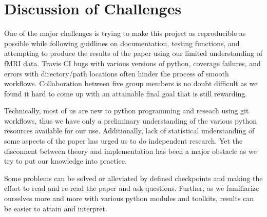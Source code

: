 \section{Discussion of Challenges}

\par \indent One of the major challenges is trying to make this project as 
reproducible as possible while following guidlines on documentation, testing 
functions, and attempting to produce the results of the paper using our limited
understanding of fMRI data. Travis CI bugs with various versions of python, 
coverage failures, and errors with directory/path locations often hinder the 
process of smooth workflows. Collaboration between five group members is no 
doubt difficult as we found it hard to come up with an attainable final goal 
that is still rewarding. 
\par Technically, most of us are new to python programming and reseach using 
git workflows, thus we have only a preliminary understanding of the various 
python resources available for our use. Additionally, lack of statistical 
understanding of some aspects of the paper has urged us to do independent 
research. Yet the disconnent between theory and implementation has been a major 
obstacle as we try to put our knowledge into practice. 
\par Some problems can be solved or alleviated by defined checkpoints and making
the effort to read and re-read the paper and ask questions. Further, as we 
familiarize ourselves more and more  with various python modules and toolkits, 
results can be easier to attain and interpret.
